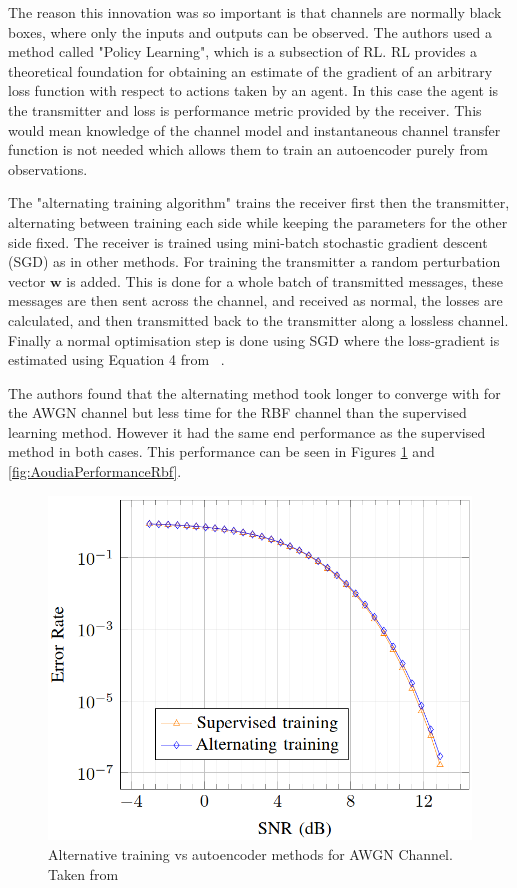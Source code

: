 \documentclass[12pt,onecolumn,letterpaper]{article}
\begin{document}
The reason this innovation was so important is that channels are normally black boxes, where only the inputs and outputs can be observed. The authors used a method called "Policy Learning", which is a subsection of RL. RL provides a theoretical foundation for obtaining an estimate of the gradient of an arbitrary loss function with respect to actions taken by an agent. In this case the agent is the transmitter and loss is performance metric provided by the receiver. This would mean knowledge of the channel model and instantaneous channel transfer function is not needed which allows them to train an autoencoder purely from observations. 

The "alternating training algorithm" trains the receiver first then the transmitter, alternating between training each side while keeping the parameters for the other side fixed. The receiver is trained using mini-batch stochastic gradient descent (SGD) as in other methods. For training the transmitter a random perturbation vector $\mathbf{w}$ is added. This is done for a whole batch of transmitted messages, these messages are then sent across the channel, and received as normal, the losses are calculated, and then transmitted back to the transmitter along a lossless channel. Finally a normal optimisation step is done using SGD where the loss-gradient is estimated using Equation 4 from ~\cite{Aoudia}. 

The authors found that the alternating method took longer to converge with for the AWGN channel but less time for the RBF channel than the supervised learning method. However it had the same end performance as the supervised method in both cases. This performance can be seen in Figures \ref{fig:AoudiaPerformanceAwgn} and \ref{fig:AoudiaPerformanceRbf}.

\begin{figure}[t]
\begin{center}
   \includegraphics[width=0.8\linewidth]{figures/Aoudia_AWGN_performance.PNG}
\end{center}
   \caption{Alternative training vs autoencoder methods for AWGN Channel. Taken from~\cite{Aoudia}}
\label{fig:AoudiaPerformanceAwgn}
\end{figure}
\end{document}
